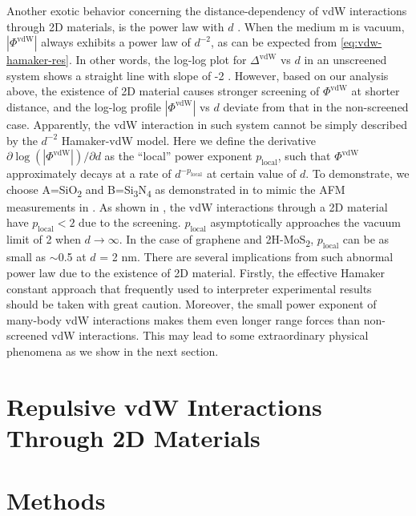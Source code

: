 Another exotic behavior concerning the distance-dependency of vdW
interactions through 2D materials, is the power law with $d$
.
%
When the medium m is vacuum, \(|\Phi^{\mathrm{vdW}}|\) always exhibits a
power law of \(d^{-2}\), as can be expected from
\autoref{eq:vdw-hamaker-res}.
%
In other words, the log-log plot for \(\Delta^{\mathrm{vdW}}\) vs
\(d\) in an unscreened system shows a straight line with slope of -2
.
%
However, based on our analysis above, the existence of 2D material
causes stronger screening of $\Phi^{\mathrm{vdW}}$ at shorter
distance, and the log-log profile \(|\Phi^{\mathrm{vdW}}|\) vs \(d\)
deviate from that in the non-screened case.
%
Apparently, the vdW interaction in such system cannot be simply
described by the $d^{-2}$ Hamaker-vdW model. Here we define the
derivative $\partial \log(|\Phi^{\mathrm{vdW}}|)/ \partial d$ as the
``local'' power exponent $p_{\mathrm{local}}$, such that
$\Phi^{\mathrm{vdW}}$ approximately decays at a rate of
$d^{-p_{\mathrm{local}}}$ at certain value of $d$.
%
To demonstrate, we choose A=SiO\textsubscript{2} and
B=Si\textsubscript{3}N\textsubscript{4} as demonstrated in
 to mimic the AFM measurements in
\textcite{Tsoi_2014_vdW_screening_2D}.
%
As shown in , the vdW interactions through a 2D material have $p_{\mathrm{local}} < 2$ due to the screening.
\(p_{\mathrm{local}}\) asymptotically approaches the vacuum limit of 2 when $d \to \infty$.
%
In the case of graphene and 2H-MoS\textsubscript{2},
\(p_{\mathrm{local}}\) can be as small as $\sim{}$0.5 at \(d\) = 2 nm.
There are several implications from such abnormal power law due to the
existence of 2D material. Firstly, the effective Hamaker constant
approach that frequently used to interpreter experimental
results~\cite{Tsoi_2014_vdW_screening_2D} should be
taken with great caution. Moreover, the small power exponent of
many-body vdW interactions makes them even longer range forces than
non-screened vdW interactions. This may lead to some extraordinary
physical phenomena as we show in the next section.

\section{Repulsive vdW Interactions Through 2D Materials}
\label{sec:repuls-vdw-inter}










\section{Methods}
\label{sec:vdw-methods}




